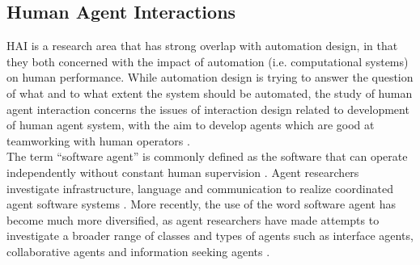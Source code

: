 
\subsection{Human Agent Interactions}\label{sec:LRHAI}
\acf{HAI} is a research area that has strong overlap with automation design, in that they both concerned with the impact of automation (i.e. computational systems) on human performance. While automation design is trying to answer the question of what and to what extent the system should be automated, the study of human agent interaction concerns the issues of interaction design related to development of human agent system, with the aim to develop agents which are good at teamworking with human operators \citep{Bradshaw2011,Sukthankara}. \\

The term ``software agent'' is commonly defined as the software that can operate independently without constant human supervision \citep{Vlassis2007}. Agent researchers investigate infrastructure, language and communication to realize coordinated agent software systems \citep{Nwana1996}. More recently, the use of the word software agent has become much more diversified, as agent researchers have made attempts to investigate a broader range of classes and types of agents such as interface agents, collaborative agents and information seeking agents \citep{Nwana1996}.  \\

